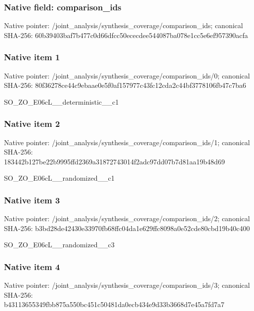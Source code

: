 \documentclass[10pt,a4paper]{article}
\begin{document}
\subsubsection{Native field: comparison\_ids}


Native pointer: /joint\_analysis/synthesi\allowbreak{}s\_coverage/comparison\_id\allowbreak{}s; canonical SHA-256: 60b39403baf7b477c0d66dfc\allowbreak{}c50ececdee544087ba078e1c\allowbreak{}c5e6ef957390acfa



\subsubsection{Native item 1}


Native pointer: /joint\_analysis/synthesi\allowbreak{}s\_coverage/comparison\_id\allowbreak{}s/0; canonical SHA-256: 80f36278ce44c9ebaae0e5f0\allowbreak{}af157977c43fc12cda2c44bf\allowbreak{}3778106fb47c7ba6


SO\_ZO\_E06cL\_\_deterministic\_\_c1


\subsubsection{Native item 2}


Native pointer: /joint\_analysis/synthesi\allowbreak{}s\_coverage/comparison\_id\allowbreak{}s/1; canonical SHA-256: 183442b127be22b9995ffd23\allowbreak{}69a31872743014f2adc97dd0\allowbreak{}7b7d81aa19b48d69


SO\_ZO\_E06cL\_\_randomized\_\_c1


\subsubsection{Native item 3}


Native pointer: /joint\_analysis/synthesi\allowbreak{}s\_coverage/comparison\_id\allowbreak{}s/2; canonical SHA-256: b3bd28de42430e33970fb68f\allowbreak{}fc04da1e629ffc8098a0e52c\allowbreak{}de80cbd19b40c400


SO\_ZO\_E06cL\_\_randomized\_\_c3


\subsubsection{Native item 4}


Native pointer: /joint\_analysis/synthesi\allowbreak{}s\_coverage/comparison\_id\allowbreak{}s/3; canonical SHA-256: b43113655349fbb875a550bc\allowbreak{}451c50481da0ecb434e9d33b\allowbreak{}3668d7e45a7fd7a7
\end{document}
